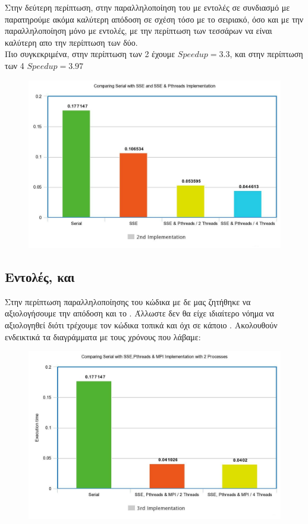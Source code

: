 \documentclass{article}
\begin{document}
Στην δεύτερη περίπτωση, στην παραλληλοποίηση του  με  εντολές σε συνδιασμό με   παρατηρούμε ακόμα καλύτερη απόδοση σε σχέση τόσο με το σειριακό, όσο και με την παραλληλοποίηση μόνο με  εντολές, με την περίπτωση των τεσσάρων  να είναι καλύτερη απο την περίπτωση των δύο.\\
Πιο συγκεκριμένα, στην περίπτωση των 2  έχουμε $Speedup = 3.3$, και στην περίπτωση των 4  $Speedup = 3.97$\\
\vspace{12mm}
\begin{figure}[h!]
\centering
  \includegraphics[width=0.8\linewidth]{SSE_PTHREADS.jpeg}
  \caption{}
\end{figure}

\newpage
\subsection{ Εντολές,  και  }

Στην περίπτωση παραλληλοποίησης του κώδικα με  δε μας ζητήθηκε να αξιολογήσουμε την απόδοση και το . Άλλωστε δεν θα είχε ιδιαίτερο νόημα να αξιολογηθεί διότι τρέχουμε τον κώδικα τοπικά και όχι σε κάποιο . Ακολουθούν ενδεικτικά τα διαγράμματα με τους χρόνους που 
λάβαμε:
\vspace{5mm}
\begin{figure}[h!]
\centering 
  \includegraphics[width=0.8\linewidth]{MPI2.jpeg}
  \caption{ }
\end{figure}
\end{document}
